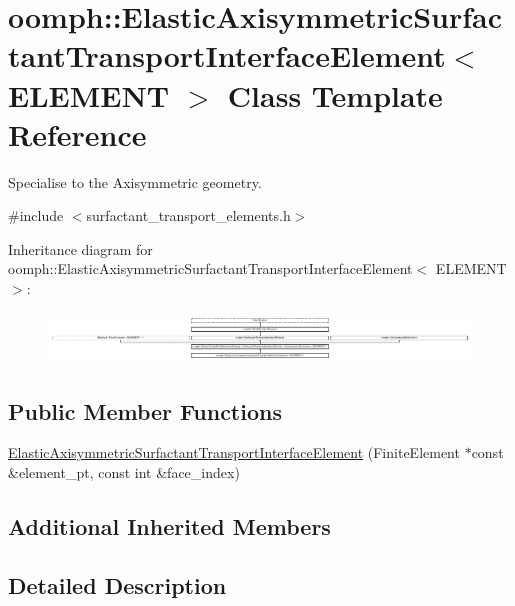 \hypertarget{classoomph_1_1ElasticAxisymmetricSurfactantTransportInterfaceElement}{}\section{oomph\+:\+:Elastic\+Axisymmetric\+Surfactant\+Transport\+Interface\+Element$<$ E\+L\+E\+M\+E\+NT $>$ Class Template Reference}
\label{classoomph_1_1ElasticAxisymmetricSurfactantTransportInterfaceElement}


Specialise to the Axisymmetric geometry.  




{\ttfamily \#include $<$surfactant\+\_\+transport\+\_\+elements.\+h$>$}

Inheritance diagram for oomph\+:\+:Elastic\+Axisymmetric\+Surfactant\+Transport\+Interface\+Element$<$ E\+L\+E\+M\+E\+NT $>$\+:\begin{figure}[H]
\begin{center}
\leavevmode
\includegraphics[height=1.323877cm]{classoomph_1_1ElasticAxisymmetricSurfactantTransportInterfaceElement}
\end{center}
\end{figure}
\subsection*{Public Member Functions}
\begin{DoxyCompactItemize}
\item 
\hyperlink{classoomph_1_1ElasticAxisymmetricSurfactantTransportInterfaceElement_a7e0f4dbf25bf0556a2675e599eeb6365}{Elastic\+Axisymmetric\+Surfactant\+Transport\+Interface\+Element} (Finite\+Element $\ast$const \&element\+\_\+pt, const int \&face\+\_\+index)
\end{DoxyCompactItemize}
\subsection*{Additional Inherited Members}


\subsection{Detailed Description}
